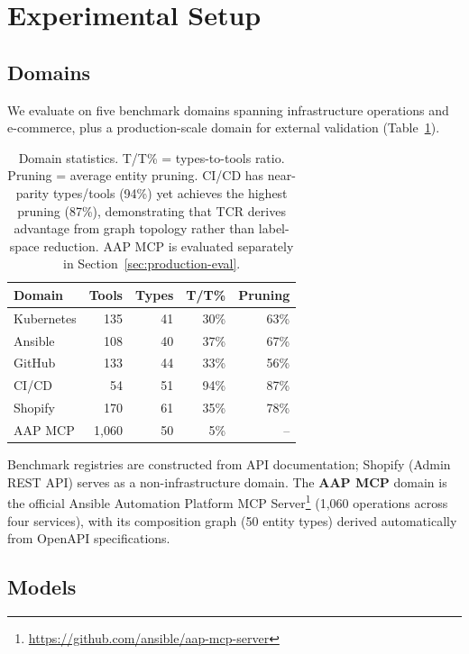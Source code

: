 
\section{Experimental Setup}
\label{sec:experimental-setup}

\subsection{Domains}
\label{sec:domains}

We evaluate on five benchmark domains spanning infrastructure operations and e-commerce, plus a production-scale domain for external validation (Table~\ref{tab:domain-stats}).

\begin{table}[t]
\centering
\small
\begin{tabular}{l rrr r}
\toprule
\textbf{Domain} & \textbf{Tools} & \textbf{Types} & \textbf{T/T\%} & \textbf{Pruning} \\
\midrule
Kubernetes & 135 & 41 & 30\% & 63\% \\
Ansible & 108 & 40 & 37\% & 67\% \\
GitHub & 133 & 44 & 33\% & 56\% \\
CI/CD & 54 & 51 & 94\% & 87\% \\
Shopify & 170 & 61 & 35\% & 78\% \\
\midrule
AAP MCP & 1,060 & 50 & 5\% & -- \\
\bottomrule
\end{tabular}
\caption{Domain statistics. T/T\% = types-to-tools ratio. Pruning = average entity pruning. CI/CD has near-parity types/tools (94\%) yet achieves the highest pruning (87\%), demonstrating that TCR derives advantage from graph topology rather than label-space reduction. AAP MCP is evaluated separately in Section~\ref{sec:production-eval}.}
\label{tab:domain-stats}
\end{table}

Benchmark registries are constructed from API documentation; Shopify (Admin REST API) serves as a non-infrastructure domain.
The \textbf{AAP MCP} domain is the official Ansible Automation Platform MCP Server\footnote{\url{https://github.com/ansible/aap-mcp-server}} (1,060 operations across four services), with its composition graph (50 entity types) derived automatically from OpenAPI specifications.

\subsection{Models}
\label{sec:models}

